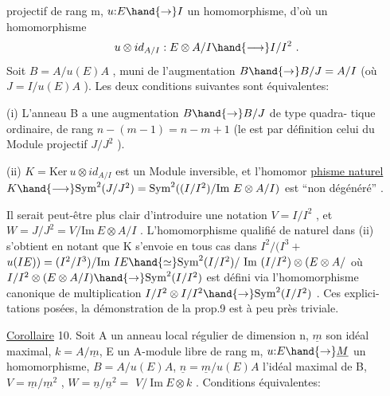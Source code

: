 \placedmargin{\unsure{$\diagup$}}

projectif de rang m,  $u{:}E \hand{\to} I$ un homomorphisme, d'où un homomorphisme
\[ u\otimes id_{A/I} : E\otimes A/I \hand{\longrightarrow} I/I^2 \ . \]
 Soit $B = A/u(E)A$ , muni de l'augmentation $B\hand{\to} B/J = A/I$
(où $J = I/u(E)A$ ). Les deux conditions suivantes sont équivalentes:

\placedmargin{$\|$} (i) L'anneau  B  a une augmentation $B\hand{\to} B/J$ de type quadra-%
tique ordinaire, de rang $n-(m-1)= n-m+1$ (le 
est par définition celui du Module projectif $J/J^2$ ).

\placedmargin{$|$} (ii) $K = \mathrm{Ker}\ u\otimes id_{A/I}$ est un Module inversible, et l'homomor
\uline{phisme naturel} $K \hand{\longrightarrow} \mathrm{Sym}^2(J/J^2) = \mathrm{Sym}^2( (I/I^2)/\mathrm{Im}\ E\otimes A/I )$ est
``non dégénéré'' .

Il serait peut-être plus clair d'introduire une notation $V = I/I^2$ ,
et $W = J/J^2 = V / \mathrm{Im}\ E\otimes A/I$ . L'homomorphisme qualifié de naturel
dans (ii) s'obtient en notant que K s'envoie en tous cas dans
\placedmargin{$\|$} $I^2/(I^3 +$  $u(IE)) = (I^2/I^3)/\mathrm{Im}\ IE \hand{\simeq} \mathrm{Sym}^2(I/I^2)/\ \mathrm{Im}\ (I/I^2)\otimes(E\otimes A/$
où $I/I^2 \otimes(E \otimes A/I) \hand{\to} \mathrm{Sym}^2(I/I^2)$ est défini via l'homomorphisme
canonique de multiplication $I/I^2 \otimes I/I^2 \hand{\to} \mathrm{Sym}^2(I/I^2 )$ . Ces explici-%
tations posées, la démonstration de la prop.9 est à peu près triviale.

\placedmargin{\unsure{$\diagup$}}
\uline{Corollaire} 10. Soit A un anneau local régulier de dimension n, $\underline{m}$ son
idéal maximal, $k=A/\underline{m}$, E un A-module libre de rang m, $u{:}E \hand{\to} \underline{M}$ un homomorphisme,
 $B = A/u(E)A$, $\underline{n} = \underline{m}/u(E)A$ l'idéal maximal de B,
$V = \underline{m}/\underline{m}^2$ , $W = \underline{n}/\underline{n}^2 =$  $V/\ \mathrm{Im}\ E\otimes k$ . Conditions équivalentes:

